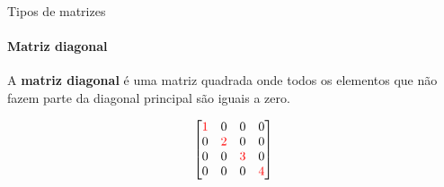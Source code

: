 \begin{frame}[t]{Tipos de matrizes} 
    \framesubtitle{Matriz diagonal}

    A \textbf{matriz diagonal} é uma matriz quadrada onde todos os elementos que não fazem parte da diagonal principal são iguais a zero.
    \vspace*{0.5cm}

    \begin{equation}
            \begin{bmatrix}
            \textcolor{red}{1} & 0 & 0 & 0\\
            0 & \textcolor{red}{2} & 0 & 0\\
            0 & 0 & \textcolor{red}{3} & 0\\ 
            0 & 0 & 0 & \textcolor{red}{4}\\ 
         \end{bmatrix}
    \end{equation}
\end{frame}

